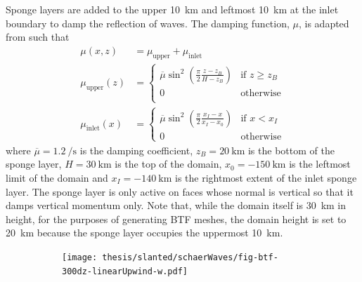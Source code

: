 Sponge layers are added to the upper \SI{10}{\kilo\meter} and leftmost \SI{10}{\kilo\meter} at the inlet boundary to damp the reflection of waves.
The damping function, \(\mu\), is adapted from \citet{melvin2010} such that
\begin{align}
	\mu(x, z) &= \mu_\mathrm{upper} + \mu_\mathrm{inlet} \\
	\mu_\mathrm{upper}(z) &= \begin{cases}
		\overline{\mu} \sin^2 \left( \frac{\pi}{2} \frac{z - z_B}{H - z_B} \right) & \text{if } z \geq z_B \\
		0 & \text{otherwise} \\
	\end{cases} \\
	\mu_\mathrm{inlet}(x) &= \begin{cases}
		\overline{\mu} \sin^2 \left( \frac{\pi}{2} \frac{x_I - x}{x_I - x_0} \right) & \text{if } x < x_I \\
		0 & \text{otherwise}
	\end{cases}
\end{align}
where $\overline{\mu} = \SI{1.2}{\per\second}$ is the damping coefficient, $z_B = \SI{20}{\kilo\meter}$ is the bottom of the sponge layer, $H = \SI{30}{\kilo\meter}$ is the top of the domain, $x_0 = \SI{-150}{\kilo\meter}$ is the leftmost limit of the domain and $x_I = \SI{-140}{\kilo\meter}$ is the rightmost extent of the inlet sponge layer.  The sponge layer is only active on faces whose normal is vertical so that it damps vertical momentum only.
Note that, while the domain itself is \SI{30}{\kilo\meter} in height, for the purposes of generating BTF meshes, the domain height is set to \SI{20}{\kilo\meter} because the sponge layer occupies the uppermost \SI{10}{\kilo\meter}.

\begin{figure}
	\centering
	\begin{subfigure}{0.58\textwidth}
		\centering
		\texttt{[image: thesis/slanted/schaerWaves/fig-btf-300dz-linearUpwind-w.pdf]}
		\caption{}
		\label{fig:slanted:schaerWaves:w:linearUpwind}
	\end{subfigure}
	\begin{subfigure}{0.38\textwidth}
		\centering
		\caption{\citep{melvin2010}}
		\label{fig:slanted:schaerWaves:w:melvin}
	\end{subfigure}
	\caption{ }
	\label{fig:slanted:schaerWaves:w}
\end{figure}

